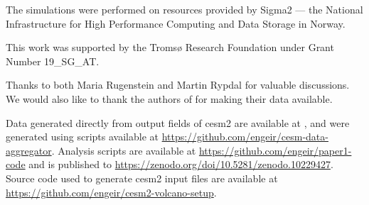 \documentclass{ametsocV6.1}
\begin{document}
\clearpage
\acknowledgments{}

The simulations were performed on resources provided by Sigma2 --- the National
Infrastructure for High Performance Computing and Data Storage in Norway.

This work was supported by the Tromsø Research Foundation under Grant Number 19\_SG\_AT.

Thanks to both Maria Rugenstein and Martin Rypdal for valuable discussions. We would
also like to thank the authors of \citet{gregory2016, ottobliesner2016,
  marshall2020dataset} for making their data available.

%
%
\datastatement{}

Data generated directly from output fields of \gls{cesm2} are available at
\citet{enger2024}, and were generated using scripts available at
\url{https://github.com/engeir/cesm-data-aggregator}. Analysis scripts are available at
\url{https://github.com/engeir/paper1-code} and is published to
\url{https://zenodo.org/doi/10.5281/zenodo.10229427}. Source code used to generate
\gls{cesm2} input files are available at
\url{https://github.com/engeir/cesm2-volcano-setup}.
\end{document}
